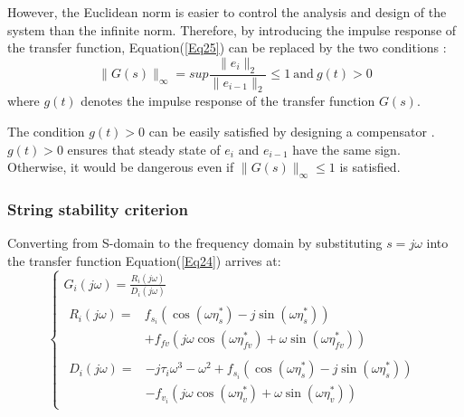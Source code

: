 \documentclass[journal]{IEEEtran}
\begin{document}
However, the Euclidean norm is easier to control the analysis and design of the system than the infinite norm. Therefore, by introducing the impulse response of the transfer function, Equation(\ref{Eq25}) can be replaced by the two conditions \citep{Swaroop1994,Darbha1999}:
\begin{equation}
  \parallel G\left(s\right)\parallel_\infty = sup\frac{\parallel e_i\parallel_2}{\parallel e_{i-1}\parallel_2}\le1\mathrm{\ and\ }g(t)>0
  \label{Eq26}
\end{equation}
where $g(t)$ denotes the impulse response of the transfer function $G(s)$.

The condition $g(t)>0$ can be easily satisfied by designing a compensator \citep{Rajamani2011,Darbha2003}. $g(t)>0$ ensures that steady state of $e_i$ and $e_{i-1}$ have the same sign. Otherwise, it would be dangerous even if $\parallel G\left(s\right)\parallel_\infty\le1$ is satisfied.

\subsubsection{String stability criterion}
\label{Section 4.3.2}

Converting from S-domain to the frequency domain by substituting $s=j\omega$ into the transfer function Equation(\ref{Eq24}) arrives at:
\begin{equation}
  \left\{\begin{array}{l}
    G_{i}(j \omega)=\frac{R_{i}(j \omega)}{D_{i}(j \omega)} \\
    \begin{aligned}
      R_{i}(j \omega)= & f_{s_{i}}\left(\cos \left(\omega \eta_{s}^{*}\right)-j \sin \left(\omega \eta_{s}^{*}\right)\right) \\
                       & +f_{f v}\left(j \omega \cos \left(\omega \eta_{f v}^{*}\right)
      +\omega \sin \left(\omega \eta_{f v}^{*}\right)\right)
    \end{aligned}                              \\
    \begin{aligned}
      D_{i}(j \omega)= & -j \tau_{i} \omega^{3}-\omega^{2}+f_{s_{i}}\left(\cos \left(\omega \eta_{s}^{*}\right)-j \sin \left(\omega \eta_{s}^{*}\right)\right) \\
                       & -f_{v_{i}}\left(j \omega \cos \left(\omega \eta_{v}^{*}\right)+\omega \sin \left(\omega \eta_{v}^{*}\right)\right)
    \end{aligned}
  \end{array}\right.
  \label{Eq27}
\end{equation}
\end{document}
